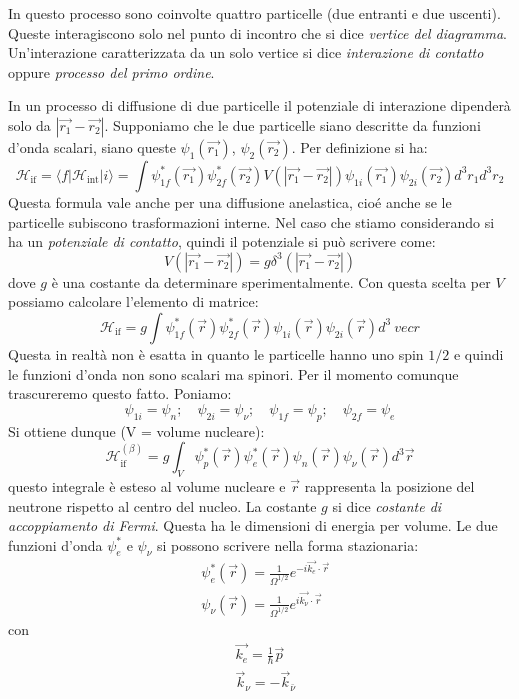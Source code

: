 In questo processo sono coinvolte quattro particelle (due entranti e due 
uscenti). Queste interagiscono solo nel punto di incontro che si dice 
\textit{vertice del diagramma}.
Un'interazione caratterizzata da un solo vertice si dice \textit{interazione di 
contatto} oppure \textit{processo del primo ordine}.

In un processo di diffusione di due particelle  il potenziale di interazione 
dipenderà solo da $|\vec{r_1}-\vec{r_2}|$. Supponiamo che le due particelle 
siano descritte da funzioni d'onda
scalari, siano queste $\psi_1(\vec{r_1})$, $\psi_2(\vec{r_2})$. Per definizione 
si ha:
\[
\mathcal{H}_{\text{if}}=\langle f|\mathcal{H}_{\text{int}}|i\rangle=\int 
\psi^*_{1f}(\vec{r_1})\psi^*_{2f}(\vec{r_2})V(|\vec{r_1}-\vec{r_2}|)\psi_{1i}
(\vec{r_1})\psi_{2i}(\vec{r_2})d^3r_1d^3r_2
\]
Questa formula vale anche per una diffusione anelastica, cioé anche se le 
particelle subiscono trasformazioni interne. Nel caso che stiamo considerando 
si ha un \textit{potenziale di contatto},
quindi il potenziale si può scrivere come:
\[
V(|\vec{r_1}-\vec{r_2}|)=g\delta^3(|\vec{r_1}-\vec{r_2}|)
\]
dove $g$ è una costante da determinare sperimentalmente. Con questa scelta per 
$V$ possiamo calcolare l'elemento di matrice:
\[
\mathcal{H}_{\text{if}}=g\int 
\psi^*_{1f}(\vec{r})\psi^*_{2f}(\vec{r})\psi_{1i}(\vec{r})\psi_{2i}(\vec{r})d^3\
vec{r}
\]
Questa in realtà non è esatta in quanto le particelle hanno uno spin $1/2$ e 
quindi le funzioni d'onda non sono scalari ma spinori. Per il momento comunque 
trascureremo questo fatto. Poniamo:
\[
\psi_{1i}=\psi_n;\quad\psi_{2i}=\psi_{\nu};\quad\psi_{1f}=\psi_p;\quad\psi_{2f}=
\psi_e
\]
Si ottiene dunque (V = volume nucleare):
\[
\mathcal{H}_{\text{if}}^{(\beta)}=
g\int_V\psi^*_p(\vec{r})\psi^*_e(\vec{r})\psi_n(\vec{r})\psi_{\nu}(\vec{r})d^3\vec{r}
\]
questo integrale è esteso al volume nucleare e $\vec{r}$ rappresenta la 
posizione del neutrone rispetto al centro del nucleo. La costante $g$ si dice 
\textit{costante di accoppiamento di Fermi}.
Questa ha le dimensioni di energia per volume. Le due funzioni d'onda 
$\psi^*_e$ e $\psi_{\nu}$ si possono scrivere nella forma stazionaria:
\begin{align*}
&\psi_e^*(\vec{r})=\frac{1}{\Omega^{1/2}}e^{-i\vec{k_e}\cdot\vec{r}}\\
&\psi_{\nu}(\vec{r})=\frac{1}{\Omega^{1/2}}e^{i\vec{k_{\nu}}\cdot\vec{r}}
\end{align*}
con
\begin{align*}
&\vec{k_e}=\frac{1}{\hbar}\vec{p}\\
&\vec{k}_{\nu}=-\vec{k}_{\bar{\nu}}
\end{align*}
